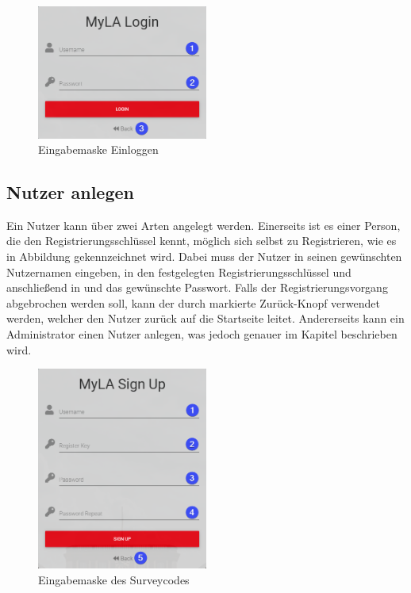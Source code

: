 \begin{figure}[H]
	\centering
	\includegraphics[width=0.5\textwidth, keepaspectratio]{img/guide/Login.png}
	\captionsetup{justification=centering, format=plain}
	\caption[Eingabemaske Einloggen]{Eingabemaske Einloggen \\\quelleScreenshot}
	\label{fig:Einloggen}
\end{figure} 

\subsection{Nutzer anlegen}
\label{ssec:NutzerAnlegen}

Ein Nutzer kann über zwei Arten angelegt werden.
Einerseits ist es einer Person, die den Registrierungsschlüssel kennt, möglich sich selbst zu Registrieren, wie es in Abbildung  gekennzeichnet wird.
Dabei muss der Nutzer in \desOne seinen gewünschten Nutzernamen eingeben, in \desTwo den festgelegten Registrierungsschlüssel und anschließend in \desThree und \desFour das gewünschte Passwort.
Falls der Registrierungsvorgang abgebrochen werden soll, kann der durch \desFive markierte Zurück-Knopf verwendet werden, welcher den Nutzer zurück auf die Startseite leitet.
Andererseits kann ein Administrator einen Nutzer anlegen, was jedoch genauer im Kapitel  beschrieben wird.

\begin{figure}[H]
	\centering
	\includegraphics[width=0.5\textwidth, keepaspectratio]{img/guide/Register.png}
	\captionsetup{justification=centering, format=plain}
	\caption[Eingabemaske Registrierung]{Eingabemaske des Surveycodes \\\quelleScreenshot}
	\label{fig:Register}
\end{figure}

